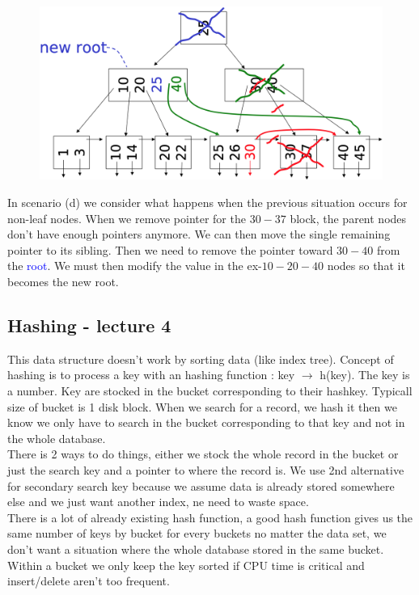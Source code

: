 \documentclass[12pt,a4paper]{article}
\begin{document}
\begin{figure}
\vspace{-5mm}
\includegraphics[scale=0.25]{img/img42.png}
\end{figure}
In scenario (d) we consider what happens when the previous situation occurs for non-leaf nodes. When we remove pointer for the $30-37$ block, the parent nodes don't have enough pointers anymore. We can then move the single remaining pointer to its \textcolor{ao}{sibling}. Then we need to remove the pointer toward $30-40$ from the \textcolor{blue}{root}. We must then modify the value in the ex-$10-20-40$ nodes so that it becomes the new root.\\


\subsection{Hashing - lecture 4}
This data structure doesn't work by sorting data (like index tree).
Concept of hashing is to process a key with an hashing function : key $\rightarrow$ h(key). The key is a number. Key are stocked in the bucket corresponding to their hashkey. Typicall size of bucket is 1 disk block. When we search for a record, we hash it then we know we only have to search in the bucket corresponding to that key and not in the whole database.\\
There is 2 ways to do things, either we stock the whole record in the bucket or just the search key and a pointer to where the record is. We use 2nd alternative for secondary search key because we assume data is already stored somewhere else and we just want another index, ne need to waste space.\\
There is a lot of already existing hash function, a good hash function gives us the same number of keys by bucket for every buckets no matter the data set, we don't want a situation where the whole database stored in the same bucket. Within a bucket we only keep the key sorted if CPU time is critical and insert/delete aren't too frequent.\\
\end{document}
